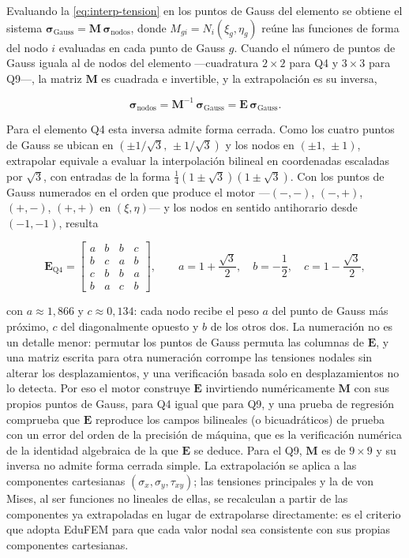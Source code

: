 Evaluando la \autoref{eq:interp-tension} en los puntos de Gauss del elemento se obtiene el sistema $\bm{\sigma}_{\text{Gauss}} = \bm{M}\,\bm{\sigma}_{\text{nodos}}$, donde $M_{gi} = N_i(\xi_g,\eta_g)$ reúne las funciones de forma del nodo $i$ evaluadas en cada punto de Gauss $g$. Cuando el número de puntos de Gauss iguala al de nodos del elemento —cuadratura $2\times2$ para Q4 y $3\times3$ para Q9—, la matriz $\bm{M}$ es cuadrada e invertible, y la extrapolación es su inversa,

\begin{equation}
\bm{\sigma}_{\text{nodos}} = \bm{M}^{-1}\,\bm{\sigma}_{\text{Gauss}} = \bm{E}\,\bm{\sigma}_{\text{Gauss}}.
\label{eq:extrap-inversa}
\end{equation}

Para el elemento Q4 esta inversa admite forma cerrada. Como los cuatro puntos de Gauss se ubican en $(\pm 1/\sqrt{3},\,\pm 1/\sqrt{3})$ y los nodos en $(\pm 1,\,\pm 1)$, extrapolar equivale a evaluar la interpolación bilineal en coordenadas escaladas por $\sqrt{3}$, con entradas de la forma $\tfrac{1}{4}(1\pm\sqrt{3})(1\pm\sqrt{3})$. Con los puntos de Gauss numerados en el orden que produce el motor —$(-,-)$, $(-,+)$, $(+,-)$, $(+,+)$ en $(\xi,\eta)$— y los nodos en sentido antihorario desde $(-1,-1)$, resulta

\begin{equation}
\bm{E}_{\text{Q4}} =
\begin{bmatrix}
a & b & b & c \\
b & c & a & b \\
c & b & b & a \\
b & a & c & b
\end{bmatrix},
\qquad
a = 1+\frac{\sqrt{3}}{2},\quad
b = -\frac{1}{2},\quad
c = 1-\frac{\sqrt{3}}{2},
\label{eq:extrap-q4}
\end{equation}

con $a \approx 1{,}866$ y $c \approx 0{,}134$: cada nodo recibe el peso $a$ del punto de Gauss más próximo, $c$ del diagonalmente opuesto y $b$ de los otros dos. La numeración no es un detalle menor: permutar los puntos de Gauss permuta las columnas de $\bm{E}$, y una matriz escrita para otra numeración corrompe las tensiones nodales sin alterar los desplazamientos, y una verificación basada solo en desplazamientos no lo detecta. Por eso el motor construye $\bm{E}$ invirtiendo numéricamente $\bm{M}$ con sus propios puntos de Gauss, para Q4 igual que para Q9, y una prueba de regresión comprueba que $\bm{E}$ reproduce los campos bilineales (o bicuadráticos) de prueba con un error del orden de la precisión de máquina, que es la verificación numérica de la identidad algebraica de la que $\bm{E}$ se deduce. Para el Q9, $\bm{M}$ es de $9\times9$ y su inversa no admite forma cerrada simple. La extrapolación se aplica a las componentes cartesianas $(\sigma_x,\sigma_y,\tau_{xy})$; las tensiones principales y la de von Mises, al ser funciones no lineales de ellas, se recalculan a partir de las componentes ya extrapoladas en lugar de extrapolarse directamente: es el criterio que adopta EduFEM para que cada valor nodal sea consistente con sus propias componentes cartesianas.

